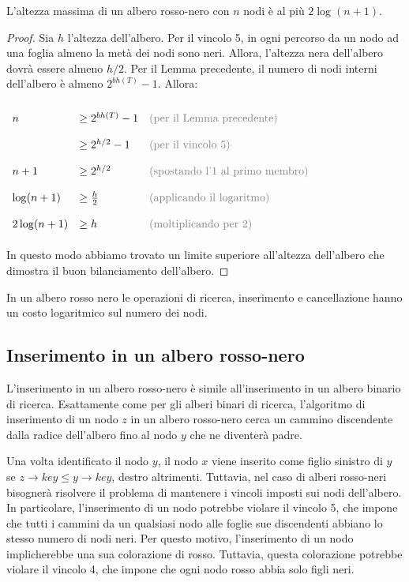 \begin{teorbox}
L'altezza massima di un albero rosso-nero con $n$ nodi è al più $2\log(n+1)$.
\end{teorbox}
\begin{proof}
Sia $h$ l'altezza dell'albero. Per il vincolo 5, in ogni percorso da un nodo ad una foglia almeno la metà dei nodi sono neri. Allora, l'altezza nera dell'albero dovrà essere almeno $h/2$. Per il Lemma precedente, il numero di nodi interni dell'albero è almeno $2^{bh(T)}-1$. Allora:
\begin{center}
$\renewcommand\arraystretch{2}
\begin{array}{lll}
n & \geq 2^{bh(T)}-1 & \textcolor{gray}{\text{(per il Lemma precedente)}} \\
& \geq 2^{h/2}-1 & \textcolor{gray}{\text{(per il vincolo 5)}} \\
n+1 & \geq 2^{h/2} & \textcolor{gray}{\text{(spostando l'1 al primo membro)}} \\
\log(n+1) & \geq \frac{h}{2} & \textcolor{gray}{\text{(applicando il logaritmo)}} \\
2\log(n+1) & \geq h & \textcolor{gray}{\text{(moltiplicando per 2)}}
\end{array}$
\end{center}

In questo modo abbiamo trovato un limite superiore all'altezza dell'albero che dimostra il buon bilanciamento dell'albero.
\end{proof}

\begin{corolbox}
In un albero rosso nero le operazioni di ricerca, inserimento e cancellazione hanno un costo logaritmico sul numero dei nodi.
\end{corolbox}

\subsection{Inserimento in un albero rosso-nero}
L'inserimento in un albero rosso-nero è simile all'inserimento in un albero binario di ricerca. Esattamente come per gli alberi binari di ricerca, l'algoritmo di inserimento di un nodo $z$ in un albero rosso-nero cerca un cammino discendente dalla radice dell'albero fino al nodo $y$ che ne diventerà padre.

Una volta identificato il nodo $y$, il nodo $x$ viene inserito come figlio sinistro di $y$ se $z\rightarrow key \leq y \rightarrow key$, destro altrimenti. Tuttavia, nel caso di alberi rosso-neri bisognerà risolvere il problema di mantenere i vincoli imposti sui nodi dell'albero. In particolare, l'inserimento di un nodo potrebbe violare il vincolo 5, che impone che tutti i cammini da un qualsiasi nodo alle foglie sue discendenti abbiano lo stesso numero di nodi neri. Per questo motivo, l'inserimento di un nodo implicherebbe una sua colorazione di rosso. Tuttavia, questa colorazione potrebbe violare il vincolo 4, che impone che ogni nodo rosso abbia solo figli neri.

